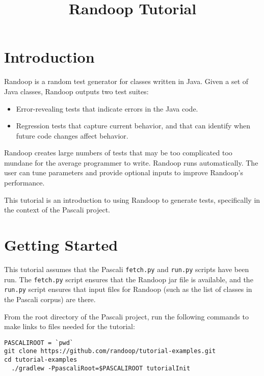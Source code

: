 \documentclass[11pt, oneside]{article} %
\title{Randoop Tutorial}
\newcommand{\cmd}[1]{{\texttt{#1}}}
\begin{document}
\maketitle

\section{Introduction}
Randoop is a random test generator for classes written in Java.
Given a set of Java classes, Randoop outputs two test suites:
\begin{itemize}
\item Error-revealing tests that indicate errors in the Java code.
\item Regression tests that capture current behavior, and that can identify
  when future code changes affect behavior.
\end{itemize}
Randoop creates large numbers of tests that may be too complicated too
mundane for the average programmer to write.
Randoop runs automatically.  The user can tune parameters and provide
optional inputs to improve Randoop's performance.

This tutorial is an introduction to using Randoop to generate tests, specifically in the context of the Pascali project.

\section{Getting Started}
This tutorial assumes that the Pascali \cmd{fetch.py} and \cmd{run.py}
scripts have been run.
The \cmd{fetch.py} script ensures that the Randoop jar file is available,
and the \cmd{run.py} script ensures that input files for Randoop (such as
the list of classes in the Pascali corpus) are there.

From the root directory of the Pascali project, run the
following commands to make links to files needed for the tutorial:
\begin{verbatim}
PASCALIROOT = `pwd`
git clone https://github.com/randoop/tutorial-examples.git
cd tutorial-examples
  ./gradlew -PpascaliRoot=$PASCALIROOT tutorialInit 
\end{verbatim}
\end{document}
